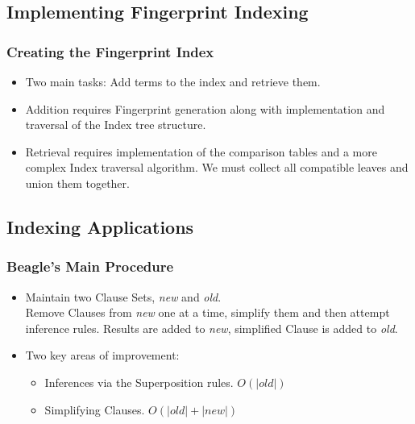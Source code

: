 \documentclass[10pt,xcolor={dvipsnames}]{beamer}
\begin{document}
\begin{NoHyper}
\subsection{Implementing Fingerprint Indexing}
\begin{frame}
  \frametitle{Creating the Fingerprint Index}
  \begin{itemize}
  \item<1-> Two main tasks: Add terms to the index and retrieve them.
  \item<2-> Addition requires Fingerprint generation along with implementation and traversal of the Index tree structure.
  \item<3-> Retrieval requires implementation of the comparison tables and a more complex
  Index traversal algorithm. We must collect all compatible leaves and union them together.
  \end{itemize}
\end{frame}

\subsection{Indexing Applications}
\begin{frame}
  \frametitle{Beagle's Main Procedure}
  \begin{itemize}
  \item<1-> 
Maintain two Clause Sets, \emph{new} and \emph{old}.\\
Remove Clauses from \emph{new} one at a time, simplify them and then
attempt inference rules. Results are added to \emph{new}, simplified Clause
is added to \emph{old}.
  \item<2-> Two key areas of improvement:
  \begin{itemize}
  \item<2-> Inferences via the Superposition rules. $O(|old|)$
  \item<2-> Simplifying Clauses. $O(|old| + |new|)$
  \end{itemize}
  \end{itemize}
\end{frame}


\end{NoHyper}
\end{document}
